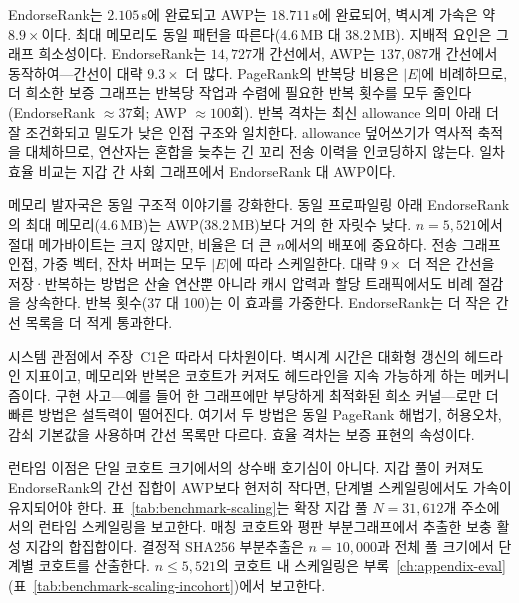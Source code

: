 EndorseRank는 $2.105$\,s에 완료되고 AWP는 $18.711$\,s에 완료되어, 벽시계 가속은 약 $8.9\times$이다. 최대 메모리도 동일 패턴을 따른다(4.6\,MB 대 38.2\,MB). 지배적 요인은 그래프 희소성이다. EndorseRank는 $14{,}727$개 간선에서, AWP는 $137{,}087$개 간선에서 동작하여---간선이 대략 $9.3\times$ 더 많다. PageRank의 반복당 비용은 $|E|$에 비례하므로, 더 희소한 보증 그래프는 반복당 작업과 수렴에 필요한 반복 횟수를 모두 줄인다(EndorseRank $\approx 37$회; AWP $\approx 100$회). 반복 격차는 최신 allowance 의미 아래 더 잘 조건화되고 밀도가 낮은 인접 구조와 일치한다. allowance 덮어쓰기가 역사적 축적을 대체하므로, 연산자는 혼합을 늦추는 긴 꼬리 전송 이력을 인코딩하지 않는다. 일차 효율 비교는 지갑 간 사회 그래프에서 EndorseRank 대 AWP이다.

메모리 발자국은 동일 구조적 이야기를 강화한다. 동일 프로파일링 아래 EndorseRank의 최대 메모리(4.6\,MB)는 AWP(38.2\,MB)보다 거의 한 자릿수 낮다. $n=5{,}521$에서 절대 메가바이트는 크지 않지만, 비율은 더 큰 $n$에서의 배포에 중요하다. 전송 그래프 인접, 가중 벡터, 잔차 버퍼는 모두 $|E|$에 따라 스케일한다. 대략 $9\times$ 더 적은 간선을 저장·반복하는 방법은 산술 연산뿐 아니라 캐시 압력과 할당 트래픽에서도 비례 절감을 상속한다. 반복 횟수(37 대 100)는 이 효과를 가중한다. EndorseRank는 더 작은 간선 목록을 더 적게 통과한다.

시스템 관점에서 주장~C1은 따라서 다차원이다. 벽시계 시간은 대화형 갱신의 헤드라인 지표이고, 메모리와 반복은 코호트가 커져도 헤드라인을 지속 가능하게 하는 메커니즘이다. 구현 사고---예를 들어 한 그래프에만 부당하게 최적화된 희소 커널---로만 더 빠른 방법은 설득력이 떨어진다. 여기서 두 방법은 동일 PageRank 해법기, 허용오차, 감쇠 기본값을 사용하며 간선 목록만 다르다. 효율 격차는 보증 표현의 속성이다.


런타임 이점은 단일 코호트 크기에서의 상수배 호기심이 아니다. 지갑 풀이 커져도 EndorseRank의 간선 집합이 AWP보다 현저히 작다면, 단계별 스케일링에서도 가속이 유지되어야 한다. 표~\ref{tab:benchmark-scaling}는 확장 지갑 풀 $N=31{,}612$개 주소에서의 런타임 스케일링을 보고한다. 매칭 코호트와 평판 부분그래프에서 추출한 보충 활성 지갑의 합집합이다. 결정적 SHA256 부분추출은 $n=10{,}000$과 전체 풀 크기에서 단계별 코호트를 산출한다. $n \leq 5{,}521$의 코호트 내 스케일링은 부록~\ref{ch:appendix-eval}(표~\ref{tab:benchmark-scaling-incohort})에서 보고한다.



